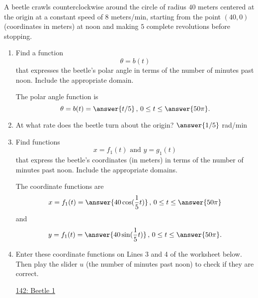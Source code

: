 \documentclass{ximera}
\begin{document}
\begin{example} \label{Edfhg]hghgdfg}
A beetle crawls counterclockwise around the circle of radius $40$ meters centered at the origin at a constant speed of $8$ meters/min, starting from the point $(40,0)$ (coordinates in meters) at noon and making $5$ complete revolutions before stopping.

\begin{enumerate}

\item Find a function
\[
    \theta = b(t)
\]
that expresses the beetle's polar angle in terms of the number of minutes past noon. Include the appropriate domain.

The polar angle function is
\[
   \theta = b(t) = \answer{t/5} \, , \, 0 \leq t \leq \answer{50\pi} .
\]

\item At what rate does the beetle turn about the origin?  $\answer{1/5}$ rad/min



\item Find functions
\[
   x = f_1(t) \text{ and } y=g_1(t)
\]
that express the beetle's coordinates (in meters)  in terms of the number of minutes past noon. Include the appropriate domains.

The coordinate functions are
\[
    x = f_1(t) = \answer{40\cos(\frac{1}{5}t)} \, , \, 0 \leq t \leq \answer{50\pi} 
\]
and 
\[
    y = f_1(t) = \answer{40\sin(\frac{1}{5}t)} \, , \, 0 \leq t \leq \answer{50\pi} .
\]

\item Enter these coordinate functions on Lines 3 and 4 of the worksheet below. Then play the slider $u$ (the number of minutes past noon) to check if they are correct.

\begin{onlineOnly}
    \begin{center}
\end{center}
\end{onlineOnly}

\href{https://www.desmos.com/calculator/pygmcbcogi}{142: Beetle 1}

\end{enumerate}
\end{example}
\end{document}
